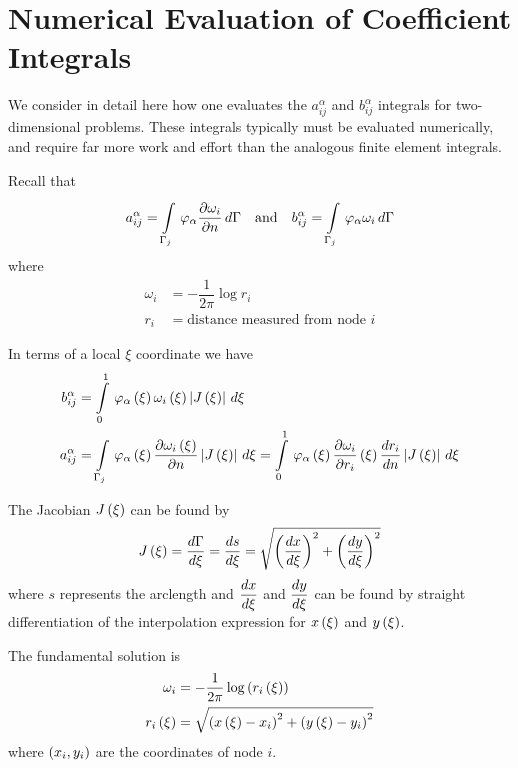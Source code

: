 \section{Numerical Evaluation of Coefficient Integrals}
\label{sec:Numevalcoeff}

We consider in detail here how one evaluates the $a_{ij}^{\alpha}$ and
$b_{ij}^{\alpha}$ integrals for two-dimensional problems.  These integrals
typically must be evaluated numerically, and require far more work and effort
than the analogous finite element integrals.

Recall that 
\begin{equation*}
  a_{ij}^{\alpha} =   \displaystyle\int\limits_{\Gamma_{j}}^{} \, \varphi_{\alpha} 
     \dfrac{\partial \omega_i}{\partial n} \,d\Gamma  \quad \text{and} \quad b_{ij}^{\alpha} = 
    \displaystyle\int\limits_{\Gamma_{j}}^{} \, \varphi_{\alpha}  \omega_{i}\,d\Gamma 
\end{equation*}
where 
\begin{align*}
  \omega_{i} &= - \dfrac{1}{2 \pi} \log r_{i}\\
  r_{i} &= \text{distance measured from node $i$}
\end{align*} 

In terms of a local $\xi$ coordinate we have
\begin{align}
  b_{ij}^{\alpha} &=   \displaystyle\int\limits_{0}^{1} \,   \varphi_{\alpha} \left( \xi \right)    \omega_{i}\left( \xi \right) 
    \left|  J\left( \xi \right)  \right|\,d\xi  \\
  a_{ij}^{\alpha} &=   \displaystyle\int\limits_{\Gamma_{j}}^{} \,   \varphi_{\alpha} \left( \xi \right)   
   \dfrac{\partial  \omega_{i}\left( \xi \right) }{\partial n}  \left|  J\left( \xi \right)  \right|\,d\xi  =   \displaystyle\int\limits_{0}^{1} \,   \varphi_{\alpha} \left( \xi \right)     \dfrac{\partial \omega_{i}}{\partial r_{i}} \left( \xi \right)    \dfrac{ d r_{i}}{d n} 
    \left|  J\left( \xi \right)  \right|\,d\xi 
\end{align}
  
The Jacobian $ J\left( \xi \right) $ can be found by
\begin{equation}
   J\left( \xi \right)  =  \dfrac{ d \Gamma}{d \xi}  =  \dfrac{ d s}{d \xi}  = 
  \sqrt{\left(  \dfrac{ d x}{d \xi}  \right)^{2} + \left(  \dfrac{ d y}{d \xi}  \right)^{2}}
  \label{eqn:Jacobian}
\end{equation}
where $s$ represents the arclength and $ \dfrac{ d x}{d \xi} $ and $ \dfrac{ d y}{d \xi} $ can be found by
straight differentiation of the interpolation expression for $ x\left( \xi \right) $ and
$ y\left( \xi \right) $.

The fundamental solution is
\begin{align*}
  \omega_{i} &= -\dfrac{1}{2 \pi} \log \left(  r_{i}\left( \xi \right)  \right) \\
   r_{i}\left( \xi \right)  &= \sqrt{\left(  x\left( \xi \right) -x_{i} \right)^{2}+
    \left(  y\left( \xi \right) -y_{i} \right)^{2}}    
\end{align*}
where $\left( x_{i},y_{i} \right)$ are the coordinates of node $i$.

